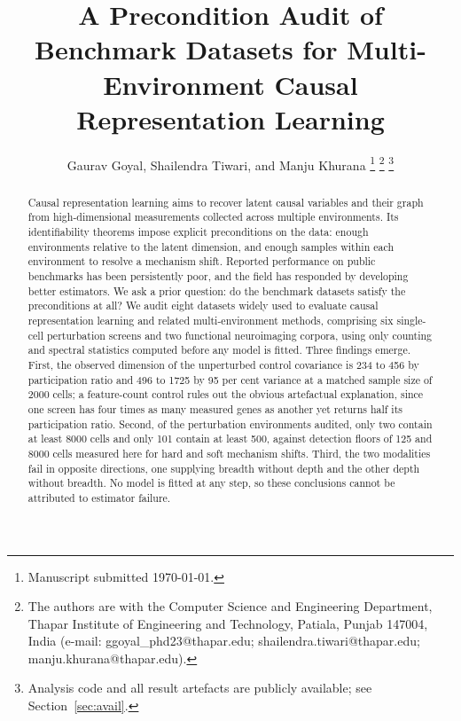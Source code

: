 \documentclass[journal,twoside,web]{ieeecolor}
\begin{document}
\title{A Precondition Audit of Benchmark Datasets for Multi-Environment Causal Representation Learning}

\author{Gaurav Goyal, Shailendra Tiwari, and Manju Khurana
\thanks{Manuscript submitted \today.}
\thanks{The authors are with the Computer Science and Engineering Department,
Thapar Institute of Engineering and Technology, Patiala, Punjab 147004, India
(e-mail: ggoyal\_phd23@thapar.edu; shailendra.tiwari@thapar.edu;
manju.khurana@thapar.edu).}
\thanks{Analysis code and all result artefacts are publicly available; see
Section~\ref{sec:avail}.}}

\maketitle

\begin{abstract}
Causal representation learning aims to recover latent causal variables and
their graph from high-dimensional measurements collected across multiple
environments. Its identifiability theorems impose explicit preconditions on
the data: enough environments relative to the latent dimension, and enough
samples within each environment to resolve a mechanism shift. Reported
performance on public benchmarks has been persistently poor, and the field has
responded by developing better estimators. We ask a prior question: do the
benchmark datasets satisfy the preconditions at all? We audit eight datasets
widely used to evaluate causal representation learning and related
multi-environment methods, comprising six single-cell perturbation screens and
two functional neuroimaging corpora, using only counting and spectral
statistics computed before any model is fitted. Three findings emerge. First,
the observed dimension of the unperturbed control covariance is 234 to 456 by
participation ratio and 496 to 1725 by 95 per cent variance at a matched
sample size of 2000 cells; a feature-count control rules out the obvious
artefactual explanation, since one screen has four times as many measured
genes as another yet returns half its participation ratio. Second, of the
perturbation environments audited, only two contain at least 8000 cells and
only 101 contain at least 500, against detection floors of 125 and 8000 cells
measured here for hard and soft mechanism shifts. Third, the two modalities
fail in opposite directions, one supplying breadth without depth and the other
depth without breadth. No model is fitted at any step, so these conclusions
cannot be attributed to estimator failure.
\end{abstract}
\end{document}
